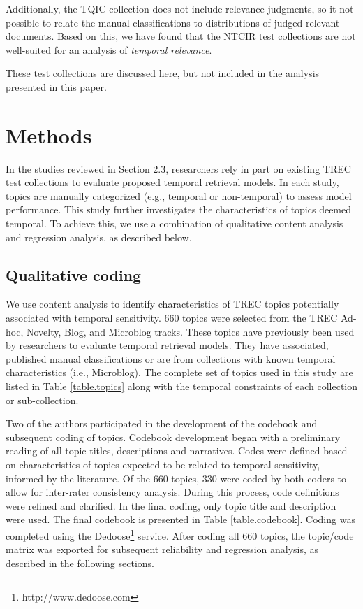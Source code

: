 \documentclass{sig-alternate}
\begin{document}
Additionally, the TQIC collection does not include relevance judgments, so it not possible to relate the manual classifications to distributions of judged-relevant documents. Based on this, we have found that the NTCIR test collections are not well-suited for an analysis of \emph{temporal relevance}.

These test collections are discussed here, but not included in the analysis presented in this paper.


\section{Methods}

In the studies reviewed in Section 2.3, researchers rely in part on existing TREC test collections to evaluate proposed temporal retrieval models. In each study, topics are manually categorized (e.g.,  temporal or non-temporal) to assess model performance. This study further investigates the characteristics of topics deemed temporal. To achieve this, we use a combination of qualitative content analysis and regression analysis, as described below.

\subsection{Qualitative coding}
We use content analysis \cite{Krippendorff1980} to identify characteristics of TREC topics potentially associated with temporal sensitivity. 660 topics were selected from the TREC Ad-hoc, Novelty, Blog, and Microblog tracks. These topics have previously been used by researchers to evaluate temporal retrieval models. They have associated, published manual classifications or are from collections with known temporal characteristics (i.e., Microblog). The complete set of topics used in this study are listed in Table \ref{table.topics} along with the temporal constraints of each collection or sub-collection.



Two of the authors participated in the development of the codebook and subsequent coding of topics. Codebook development began with a preliminary reading of all topic titles, descriptions and narratives. Codes were defined based on characteristics of topics expected to be related to temporal sensitivity, informed by the literature. Of the 660 topics, 330 were coded by both coders to allow for inter-rater consistency analysis. During this process, code definitions were refined and clarified. In the final coding, only topic title and description were used. The final codebook is presented in Table \ref{table.codebook}. Coding was completed using the Dedoose\footnote{http://www.dedoose.com} service.  After coding all 660 topics, the topic/code matrix was exported for subsequent reliability and regression analysis, as described in the following sections. 
\end{document}
